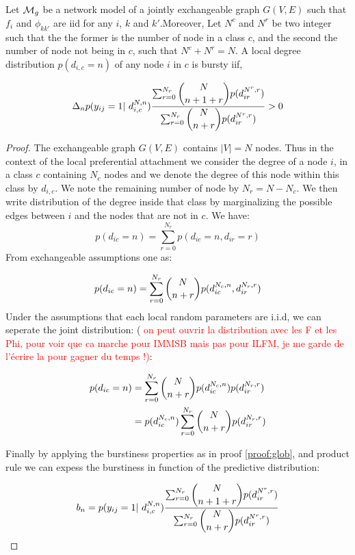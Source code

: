 \begin{theorem} \label{th:burst_exch}
	Let $\mathcal{M}_g$ be a network model of a jointly exchangeable graph $G(V,E)$ such that $f_i$ and $\phi_{kk'}$ are iid for any $i$, $k$ and $k'$.Moreover,  Let $N^c$ and $N^r$ be two integer such that the the former is the number of node in a class $c$, and the second the number of node not being in $c$, such that $N^c+N^r = N$. A local degree distribution $p(d_{i,c}=n)$ of any node $i$ in $c$ is bursty iif,
	
	\begin{equation}
\Delta_n  p(y_{ij}=1 | d_{i,c}^{N,n}) \frac{\sum_{r=0}^{N_r}\dbinom{N}{n+1+r} p(d_{ir}^{N^r,r})}{\sum_{r=0}^{N_r} \dbinom{N}{n+r} p(d_{ir}^{N^r,r}) } > 0
	\end{equation}
	
	
\end{theorem}

\begin{proof}
The exchangeable graph $G(V,E)$ contains $|V|=N$ nodes. Thus in the context of the local preferential attachment we consider the degree of a node $i$, in a class $c$ containing $N_c$ nodes and we denote the degree of this node within this class by $d_{i,c}$. We note the remaining number of node by $N_r = N - N_c$. We then write  distribution of the degree inside that class by marginalizing the possible edges between $i$ and the nodes that are not in $c$. We have:
\begin{equation}
p(d_{ic}=n) = \sum_{r=0}^{N_r} p(d_{ic}=n,d_{ir}=r)
\end{equation}
From exchangeable assumptions one as:

\begin{equation}
p(d_{ic}=n) = \sum_{r=0}^{N_r} \dbinom{N}{n+r} p(d_{ic}^{N_c, n},d_{ir}^{N_r, r})
\end{equation}
Under the assumptions that each local random parameters are i.i.d, we can seperate the joint distribution: ( \textcolor{red}{on peut ouvrir la distribution avec les F et les Phi, pour voir que ca marche pour IMMSB mais pas pour ILFM, je me garde de l'écrire la pour gagner du temps !)}: 

\begin{align}
p(d_{ic}=n) &= \sum_{r=0}^{N_r} \dbinom{N}{n+r} p(d_{ic}^{N_c, n}) p(d_{ir}^{N_r, r}) \\
 &=  p(d_{ic}^{N_c, n})\sum_{r=0}^{N_r}   \dbinom{N}{n+r} p(d_{ir}^{N_r, r})
\end{align}

Finally by applying the burstiness properties as in proof \ref{proof:glob}, and product rule we can expess the burstiness in function of the predictive distribution:

\begin{equation}
b_n =  p(y_{ij}=1 | d_{i,c}^{N,n}) \frac{\sum_{r=0}^{N_r}\dbinom{N}{n+1+r} p(d_{ir}^{N^r,r})}{\sum_{r=0}^{N_r} \dbinom{N}{n+r} p(d_{ir}^{N^r,r}) }
\end{equation}

\end{proof}

